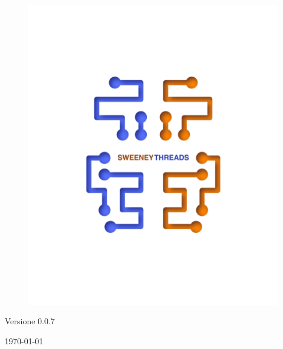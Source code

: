 \documentclass[a4paper]{article}
\begin{document}
\begin{titlepage}
		\begin{figure}[H]
			\centering
			\includegraphics[scale=0.8]{sweeney.png}
		\end{figure}
		\begin{center}
			Versione 0.0.7
		\end{center}
		{\large \today}\\[3cm] 
		\vfill  
	\end{titlepage}
	
	
	\tableofcontents
	
	\newpage 
\end{document}
